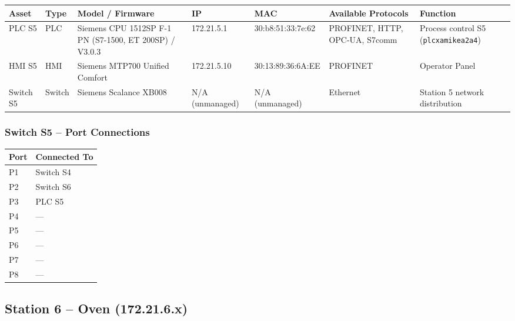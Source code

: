 \begin{adjustbox}{max width=\textwidth}
\begin{tabular}{lllllll}
\toprule
\textbf{Asset} & \textbf{Type} & \textbf{Model / Firmware} & \textbf{IP} & \textbf{MAC} & \textbf{Available Protocols} & \textbf{Function} \\
\midrule
PLC S5    & PLC    & Siemens CPU 1512SP F-1 PN (S7-1500, ET 200SP) / V3.0.3 & 172.21.5.1      & 30:b8:51:33:7e:62 & PROFINET, HTTP, OPC-UA, S7comm & Process control S5 (\texttt{plcxamikea2a4}) \\
HMI S5    & HMI    & Siemens MTP700 Unified Comfort & 172.21.5.10     & 30:13:89:36:6A:EE & PROFINET & Operator Panel \\
Switch S5 & Switch & Siemens Scalance XB008         & N/A (unmanaged) & N/A (unmanaged)   & Ethernet & Station 5 network distribution \\
\bottomrule
\end{tabular}
\end{adjustbox}

\subsubsection{Switch S5 – Port Connections}

\begin{tabular}{ll}
\toprule
\textbf{Port} & \textbf{Connected To} \\
\midrule
P1 & Switch S4 \\
P2 & Switch S6 \\
P3 & PLC S5 \\
P4 & — \\
P5 & — \\
P6 & — \\
P7 & — \\
P8 & — \\
\bottomrule
\end{tabular}

\subsection{Station 6 – Oven (172.21.6.x)}

